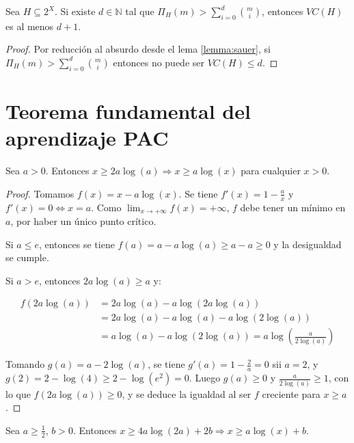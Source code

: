 \begin{corollary}
Sea $H \subseteq 2^X$. Si existe $d\in \mathbb{N}$ tal que $\Pi_{H} (m) > \sum_{i=0}^d \binom{m}{i}$,
entonces $VC(H)$ es al menos $d+1$.
\end{corollary}

\begin{proof}
Por reducción al absurdo desde el lema \ref{lemma:sauer}, si $\Pi_{H}(m) > \sum_{i=0}^d \binom{m}{i}$ entonces 
no puede ser $VC(H) \le d$.
\end{proof}

\section{Teorema fundamental del aprendizaje PAC}

\begin{lemma}
 Sea $a > 0$. Entonces $x \ge 2a \log(a) \Rightarrow x \ge a \log(x)$ para cualquier $x > 0$.
 \label{lemma:ineqlog}
\end{lemma}

\begin{proof}
 Tomamos $f(x) = x - a\log(x)$. Se tiene $f'(x) = 1 - \frac{a}{x}$ y $f'(x) = 0 \Leftrightarrow x = a$. Como 
 $\lim_{x\rightarrow +\infty}f(x) = +\infty$, $f$ debe tener un mínimo en $a$, por haber un único punto crítico.
 
 Si $a \le e$, entonces se tiene $f(a) = a-a \log(a) \ge a-a \ge 0$ y la desigualdad se cumple.
 
 Si $a > e$, entonces $2a \log(a) \ge a$ y:
 
 \begin{align*}
  f(2a \log(a)) &= 2a \log(a) - a \log(2a \log(a)) \\
	        &= 2a \log(a) - a \log(a) - a \log(2\log(a)) \\
                &= a \log(a) - a \log(2 \log(a)) = a \log \left(\frac{a}{2 \log(a)}\right)
 \end{align*}
 
 Tomando $g(a) = a - 2\log(a)$, se tiene $g'(a) = 1 - \frac{2}{a} = 0$ sii $a = 2$, y $g(2) = 2 - \log(4) \ge 2 - \log(e^2) = 0$.
 Luego $g(a) \ge 0$ y $\frac{a}{2 \log(a)} \ge 1$, con lo que $f(2a \log(a)) \ge 0$, y se deduce la igualdad al ser $f$
 creciente para $x\ge a$.
\end{proof}


\begin{lemma}
 Sea $a \ge \frac{1}{2}$, $b > 0$. Entonces $x\ge 4a \log(2a) + 2b \Rightarrow x \ge a \log(x) + b$.
 \label{lemma:boundlog}
\end{lemma}


